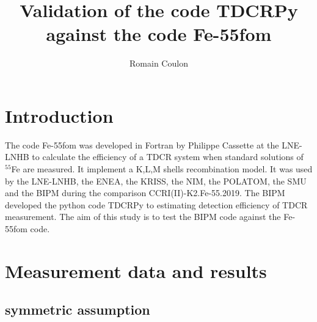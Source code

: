 \documentclass[12pt]{iopart}
\begin{document}
\title[Draft - May 2023]{Validation of the code TDCRPy against the code Fe-55fom}
\author{Romain Coulon}
\address{Bureau International des Poids et Mesures, Pavillon de Breteuil, F-92312 S\`{e}vres Cedex, France.}


\section{Introduction}

The code Fe-55fom was developed in Fortran by Philippe Cassette at the LNE-LNHB to calculate the efficiency of a TDCR system when standard solutions of $^{55}$Fe are measured. It implement a K,L,M shells recombination model. It was used by the LNE-LNHB, the ENEA, the KRISS, the NIM, the POLATOM, the SMU and the BIPM during the comparison CCRI(II)-K2.Fe-55.2019. The BIPM developed the python code TDCRPy to estimating detection efficiency of TDCR measurement. The aim of this study is to test the BIPM code against the Fe-55fom code.\\


\section{Measurement data and results}
\subsection{symmetric assumption}
\end{document}
